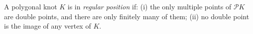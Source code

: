 A polygonal knot $K$ is in \textit{regular position} if: (i) the only multiple points of $\mathcal{P}K$ are double points, and there are only finitely many of them; (ii) no double point is the image of any vertex of $K$.
